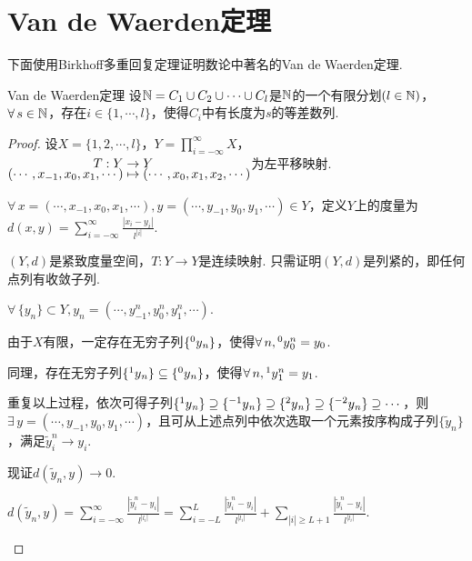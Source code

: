 \section{Van de Waerden定理}

下面使用Birkhoff多重回复定理证明数论中著名的Van de Waerden定理.\par
\begin{theorem}{Van de Waerden定理}
    设$\mathbb{N}=C_1\cup C_2\cup\cdots\cup C_l$是$\mathbb{N}$的一个有限分划$(l\in\mathbb{N})$，$\forall\, s\in\mathbb{N}$，存在$i\in\{1,\cdots,l\}$，使得$C_i$中有长度为$s$的等差数列.
\end{theorem}
\begin{proof}
    设$X=\{1,2,\cdots,l\}$，$Y=\prod_{i=-\infty}^\infty{X}$，$\setjot[-4]\begin{aligned}[t]
        T:Y&\to Y \\
        (\cdots,x_{-1},x_0,x_1,\cdots)&\mapsto (\cdots,x_0,x_1,x_2,\cdots)
    \end{aligned}$为左平移映射.\par
    $\forall\, x=(\cdots,x_{-1},x_0,x_1,\cdots),y=(\cdots,y_{-1},y_0,y_1,\cdots)\in Y$，定义$Y$上的度量为$d(x,y)=\sum_{i=-\infty}^\infty{\frac{|x_i-y_i|}{l^{|i|}}}$.\par
    \begin{claim}{$(Y,d)$是紧致度量空间，$T:Y\to Y$是连续映射.}
        只需证明$(Y,d)$是列紧的，即任何点列有收敛子列.\par
        $\forall\,\{y_n\}\subset Y,y_n=(\cdots,y_{-1}^n,y_0^n,y_1^n,\cdots)$.\par
        由于$X$有限，一定存在无穷子列$\{\prescript{0}{}y_n\}$，使得$\forall\, n,\prescript{0}{}y_0^n=y_0$.\par
        同理，存在无穷子列$\{\prescript{1}{}y_n\}\subseteq \{\prescript{0}{}y_n\}$，使得$\forall\, n,\prescript{1}{}y_{1}^n=y_{1}$.\par
        重复以上过程，依次可得子列$\{\prescript{1}{}y_n\}\supseteq\{\prescript{-1}{}y_n\}\supseteq\{\prescript{2}{}y_n\}\supseteq\{\prescript{-2}{}y_n\}\supseteq\cdots$，则$\exists\, y=(\cdots,y_{-1},y_0,y_1,\cdots)$，且可从上述点列中依次选取一个元素按序构成子列$\{\tilde{y}_n\}$，满足$\tilde{y}_i^n\to y_i$.\par
        现证$d(\tilde{y}_n,y)\to 0$.\par
        $d(\tilde{y}_n,y)=\sum_{i=-\infty}^{\infty}\frac{\left|\tilde{y}_i^n-y_i\right|}{l^{|l_i|}}=\sum_{i=-L}^L{\frac{\left|\tilde{y}_i^n-y_i\right|}{l^{|l_i|}}}+\sum_{|i|\geq L+1}{\frac{\left|\tilde{y}_i^n-y_i\right|}{l^{|l_i|}}}$.\par

\end{claim}
\end{proof}
